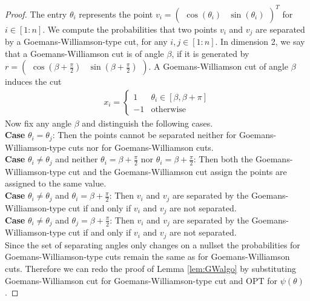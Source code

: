 \documentclass[12pt,a4paper]{article}
\theoremstyle{mythm}
\begin{document}
\begin{proof}
The entry $ \theta_i $ represents the point
$
v_i =
\begin{pmatrix}
\cos( \theta_i ) &
\sin( \theta_i ) 
\end{pmatrix} ^{ T }  
$ for $ i \in \left[ 1:n \right]  $.
We compute the probabilities that two points $ v_i $ and $ v_j $ are separated by a Goemans-Williamson-type cut, for any $ i,j \in \left[ 1:n \right]  $. 
In dimension 2, we say that a Goemans-Williamson cut is of angle $ \beta $, if it is generated by 
$ r = \begin{pmatrix}
\cos( \beta + \frac{ \pi  }{ 2 }  ) & \sin( \beta + \frac{ \pi  }{ 2 }  )
\end{pmatrix}  $.
A Goemans-Williamson cut of angle $ \beta $ induces the cut
\begin{align*}
x_i = 
\begin{cases}
1 & \theta_i \in \left[ \beta , \beta + \pi  \right] \\
-1 & \text{otherwise} 
\end{cases}
\end{align*} 
Now fix any angle $ \beta $ and distinguish the following cases. \\
\textbf{Case}  $ \theta_i = \theta_j $: 
Then the points cannot be separated neither for Goemans-Williamson-type cuts nor for Goemans-Williamson cuts. \\
\textbf{Case}  $ \theta_i \neq \theta_j  $ and neither $ \theta_i = \beta + \frac{ \pi  }{ 2 }  $ nor $ \theta_i = \beta + \frac{ \pi  }{ 2 }  $:
Then both the Goemans-Williamson-type cut and the Goemans-Williamson cut assign the points are assigned to the same value. \\
\textbf{Case}  $ \theta_i \neq \theta_j  $ and $ \theta_i = \beta + \frac{ \pi  }{ 2 }  $:
Then $ v_i $ and $ v_j $ are separated by the Goemans-Williamson-type cut if and only if $ v_i $ and $ v_j $ are not separated. \\
\textbf{Case}  $ \theta_i \neq \theta_j  $ and $ \theta_j = \beta + \frac{ \pi  }{ 2 }  $:
Then $ v_i $ and $ v_j $ are separated by the Goemans-Williamson-type cut if and only if $ v_i $ and $ v_j $ are not separated. \\
Since the set of separating angles only changes on a nullset the probabilities for Goemans-Williamson-type cuts remain the same as for Goemans-Williamson cuts.
Therefore we can redo the proof of Lemma \ref{lem:GWalgo} by substituting Goemans-Williamson cut for Goemans-Williamson-type cut and OPT for $ \psi ( \theta) $.

\end{proof}
\end{document}
